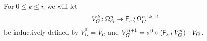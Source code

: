 \documentclass[a4paper,10pt]{article}%
\begin{document}


\begin{notation}\label{INDVNG NOT}
	For $0 \leq k \leq n$ we will let 
\[
	V_{G}^{k} \colon \Omega_{G}^{n} \to \mathsf{F}_s \wr \Omega_{G}^{n-k-1}
\]
be inductively defined by $V_{G}^{0} = V_G$ and
$V_{G}^{n+1} = \sigma^0 \circ (\mathsf{F}_s \wr V_{G}^{n}) \circ V_G$.
\end{notation}
\end{document}
